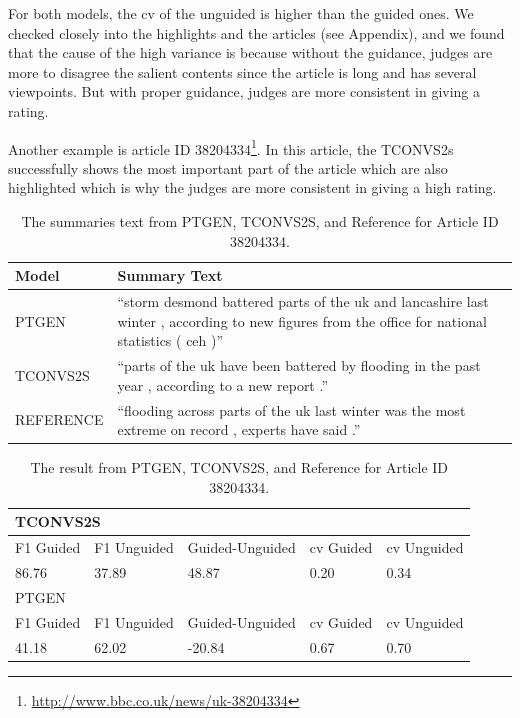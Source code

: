\documentclass[11pt,a4paper]{article}
\begin{document}
For both models, the cv of the unguided is higher than the guided ones. We checked closely into the highlights and the articles (see Appendix), and we found that the cause of the high variance is because without the guidance, judges are more to disagree the salient contents since the article is long and has several viewpoints. But with proper guidance, judges are more consistent in giving a rating.

Another example is article ID 38204334\footnote{\url{http://www.bbc.co.uk/news/uk-38204334}}. In this article, the TCONVS2s successfully shows the most important part of the article which are also highlighted which is why the judges are more consistent in giving a high rating. 

\begin{table}[h!]
  \small
  \begin{tabular}{lp{5cm}}
  Model     & Summary Text   \\
  \hline
  PTGEN     & “storm desmond battered parts of the uk and lancashire last winter , according to new figures from the office for national statistics ( ceh )”   \\
  TCONVS2S  & “parts of the uk have been battered by flooding in the past year , according to a new report .”                                        \\
  REFERENCE & “flooding across parts of the uk last winter was the most extreme on record , experts have said .”         
  \end{tabular}
  \caption{The summaries text from PTGEN, TCONVS2S, and Reference for Article ID 38204334.}
  \label{table:example38204334}
\end{table}

\begin{table}[h!]
  \small
  \begin{tabular}{p{1cm}p{1cm}p{1cm}p{1cm}p{1cm}}
    \hline
  \multicolumn{5}{l}{TCONVS2S} \\
  \hline                                
  F1 Guided & F1 Unguided & Guided-Unguided & cv Guided & cv Unguided \\
  86.76      & 37.89       & 48.87   & 0.20         & 0.34        \\
  \hline
  \multicolumn{5}{l}{PTGEN}    \\
  \hline                                
  F1 Guided & F1 Unguided & Guided-Unguided & cv Guided & cv Unguided \\
  41.18     & 62.02       & -20.84    & 0.67      & 0.70       
\end{tabular}
\caption{The result from PTGEN, TCONVS2S, and Reference for Article ID 38204334.}
\label{table:result38204334}
\end{table}
\end{document}
